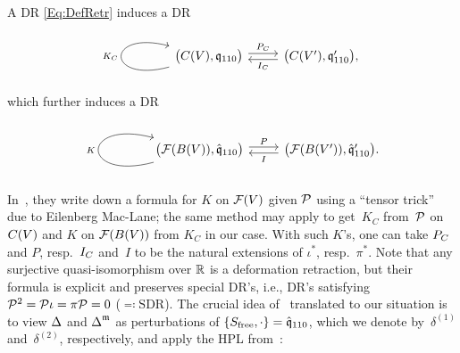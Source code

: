 \documentclass[\MainFolder/Text.tex]{subfiles}
\begin{document}
A DR \eqref{Eq:DefRetr} induces a DR
\begin{equation*}
\begin{tikzcd}
\bigl(\CycC(V),\OPQ_{110}\bigr) \arrow[loop left]{l}{K_\CycC}\arrow[shift left]{r}{P_\CycC} & \arrow[shift left]{l}{I_\CycC} \bigl(\CycC(V'),\OPQ_{110}'\bigr),
\end{tikzcd}
\end{equation*}
which further induces a DR
\begin{equation}\label{Eq:SDRSDR}
\begin{tikzcd}
\bigl(\Fun(B(V)),\hat{\OPQ}_{110}\bigr) \arrow[loop left]{l}{K}\arrow[shift left]{r}{P} & \arrow[shift left]{l}{I} \bigl(\Fun(B(V')),\hat{\OPQ}_{110}'\bigr).
\end{tikzcd}
\end{equation}
In~\cite[Remark~3]{Doubek2018}, they write down a formula for $K$ on $\mathcal{F}(V)$ given $\mathcal{P}$ using a ``tensor trick'' due to Eilenberg Mac-Lane; the same method may apply to get~$K_C$ from~$\mathcal{P}$ on $C(V)$ and $K$ on $\mathcal{F}(B(V))$ from $K_C$ in our case. With such $K$'s, one can take $P_{C}$ and $P$, resp.~$I_{C}$ and~$I$ to be the natural extensions of $\iota^*$, resp.~$\pi^*$. Note that any surjective quasi-isomorphism over $\mathbb{R}$ is a deformation retraction, but their formula is explicit and preserves special DR's, i.e., DR's satisfying $\mathcal{P}^2 = \mathcal{P} \iota = \pi \mathcal{P} = 0$ ($\eqqcolon\mathrm{SDR}$).  The crucial idea of~\cite{Doubek2018} translated to our situation is to view $\operatorname{\Delta}$ and $\operatorname{\Delta}^{\mathfrak{m}}$ as perturbations of $\{S_{\mathrm{free}},\cdot\} = \hat{\mathfrak{q}}_{110}$, which we denote by~$\delta^{(1)}$ and~$\delta^{(2)}$, respectively, and apply the HPL from~\cite{Crainic2004}:
\end{document}
